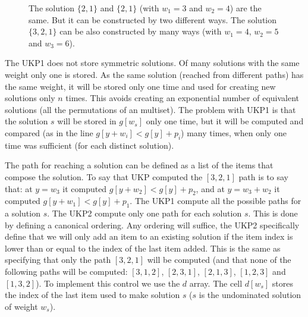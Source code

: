 \documentclass[12pt]{article}
\newcommand{\drawhvector}[6]{
	\edef \origin {#1}
	\edef \xmax {#2}
	\edef \rs {(#3,#4)}
	\edef \scale {#5}
	\foreach \x in {0,...,\xmax}{
		\draw [shift={\origin}] (\x,0) rectangle +\rs;
		\node [scale=\scale, shift={\origin}, font=\LARGE] at (\x + 0.5, 0.5) {\(\x\)};
	}
}
\begin{document}
\begin{figure}[H]
\caption{The solution \(\{2,1\}\) and \(\{2,1\}\) (with \(w_1 = 3\) and \(w_2 = 4\)) are the same. But it can be constructed by two different ways. The solution \(\{3,2,1\}\) can be also constructed by many ways (with \(w_1 = 4\), \(w_2 = 5\) and \(w_3 = 6\)). }
\label{fig:symmetry}
\end{figure}

The UKP1 does not store symmetric solutions. Of many solutions with the same weight only one is stored. As the same solution (reached from different paths) has the same weight, it will be stored only one time and used for creating new solutions only \(n\) times. This avoids creating an exponential number of equivalent solutions (all the permutations of an multiset). The problem with UKP1 is that the solution \(s\) will be stored in \(g[w_s]\) only one time, but it will be computed and compared (as in the line \(g[y + w_i] < g[y] + p_i\)) many times, when only one time was sufficient (for each distinct solution). 

The path for reaching a solution can be defined as a list of the items that compose the solution. To say that UKP computed the \([3,2,1]\) path is to say that: at \(y = w_3\) it computed \(g[y + w_2] < g[y] + p_2\), and at \(y = w_3 + w_2\) it computed \(g[y + w_1] < g[y] + p_1\). The UKP1 compute all the possible paths for a solution \(s\). The UKP2 compute only one path for each solution \(s\). This is done by defining a canonical ordering. Any ordering will suffice, the UKP2 specifically define that we will only add an item to an existing solution if the item index is lower than or equal to the index of the last item added. This is the same as specifying that only the path \([3,2,1]\) will be computed (and that none of the following paths will be computed: \([3,1,2]\), \([2,3,1]\), \([2,1,3]\), \([1,2,3]\) and \([1,3,2]\)). To implement this control we use the \(d\) array. The cell \(d[w_s]\) stores the index of the last item used to make solution \(s\) (\(s\) is the undominated solution of weight \(w_s\)). 
\end{document}
